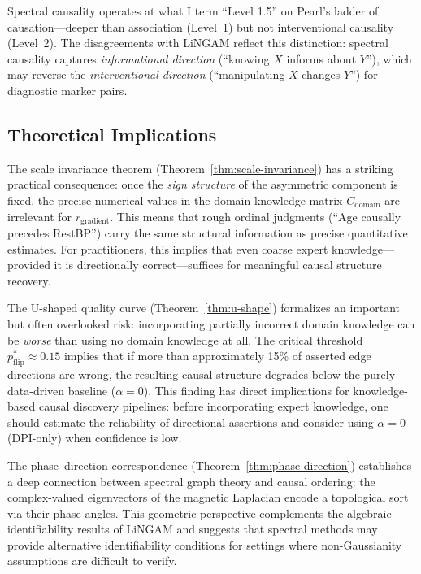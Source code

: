\documentclass[twoside,11pt]{article}
\begin{document}
Spectral causality operates at what I term ``Level 1.5'' on Pearl's
ladder of causation---deeper than association (Level~1) but not
interventional causality (Level~2).  The disagreements with LiNGAM
reflect this distinction: spectral causality captures \emph{informational
direction} (``knowing $X$ informs about $Y$''), which may reverse the
\emph{interventional direction} (``manipulating $X$ changes $Y$'') for
diagnostic marker pairs.

\subsection{Theoretical Implications}

The scale invariance theorem (Theorem~\ref{thm:scale-invariance}) has a
striking practical consequence: once the \emph{sign structure} of the
asymmetric component is fixed, the precise numerical values in the domain
knowledge matrix $C_{\mathrm{domain}}$ are irrelevant for
$r_{\mathrm{gradient}}$.  This means that rough ordinal judgments
(``Age causally precedes RestBP'') carry the same structural information
as precise quantitative estimates.  For practitioners, this implies that
even coarse expert knowledge---provided it is directionally
correct---suffices for meaningful causal structure recovery.

The U-shaped quality curve (Theorem~\ref{thm:u-shape}) formalizes an
important but often overlooked risk: incorporating partially incorrect
domain knowledge can be \emph{worse} than using no domain knowledge at
all.  The critical threshold $p_{\mathrm{flip}}^* \approx 0.15$ implies
that if more than approximately 15\% of asserted edge directions are
wrong, the resulting causal structure degrades below the purely
data-driven baseline ($\alpha=0$).  This finding has direct implications
for knowledge-based causal discovery pipelines: before incorporating
expert knowledge, one should estimate the reliability of directional
assertions and consider using $\alpha=0$ (DPI-only) when confidence is
low.

The phase--direction correspondence (Theorem~\ref{thm:phase-direction})
establishes a deep connection between spectral graph theory and causal
ordering: the complex-valued eigenvectors of the magnetic Laplacian
encode a topological sort via their phase angles.  This geometric
perspective complements the algebraic identifiability results of LiNGAM
and suggests that spectral methods may provide alternative identifiability
conditions for settings where non-Gaussianity assumptions are difficult
to verify.
\end{document}
